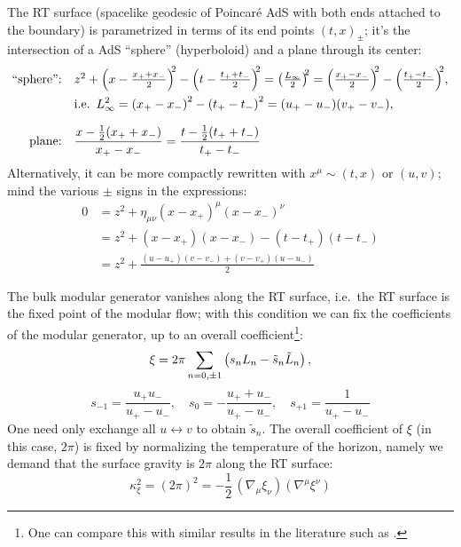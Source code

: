 \documentclass[11pt,a4paper,utf8]{article}
\begin{document}
	The RT surface (spacelike geodesic of Poincar\'e AdS with both ends attached to the boundary) is parametrized in terms of its end points $(t,x)_\pm$; it's the intersection of a AdS ``sphere'' (hyperboloid) and a plane through its center:
	\begin{equation}
	\begin{aligned}
	\text{``sphere'':} &&&\mathsmaller{
		z^2
		+ \pqty{x - \frac{x_+ + x_-}{2}}^{\!\!2}
		- \pqty{t - \frac{t_+ + t_-}{2}}^{\!\!2}
		= \pqty{\frac{L_\infty}{2}}^{\!\!2}
		= \pqty{\frac{x_+ - x_-}{2}}^{\!\!2}
		- \pqty{\frac{t_+ - t_-}{2}}^{\!\!2}
	},\\
	&&& \text{i.e.}\ \,
		L_\infty^2
		= \pqty{x_+ - x_-}^2
			- \pqty{t_+ - t_-}^2
		= (u_+ - u_-)(v_+ - v_-),
	\\[1.5ex]
	\text{plane:} &&&
		\frac{x - \frac{1}{2} (x_+ + x_-)}{x_+ - x_-}
		= \frac{t - \frac{1}{2} (t_+ + t_-)}{t_+ - t_-}
	\end{aligned}
	\end{equation}
	Alternatively, it can be more compactly rewritten with $x^\mu \sim (t,x)$ or $(u,v)$; mind the various $\pm$ signs in the expressions: 
	\begin{equation}
	\begin{aligned}
		0 &= z^2
			+ \eta_{\mu\nu} (x - x_+)^\mu (x - x_-)^\nu \\
		& = z^2
			+ (x - x_+)(x - x_-)
			- (t - t_+)(t - t_-) \\
		&= z^2 + \frac{
				(u - u_+)(v - v_-)
				+ (v - v_+)(u - u_-)
			}{2}
	\end{aligned}
	\end{equation}
	
	The bulk modular generator vanishes along the RT surface, i.e.~the RT surface is the fixed point of the modular flow; with this condition we can fix the coefficients of the modular generator, up to an overall coefficient\footnote{
		One can compare this with similar results in the literature such as \cite{Lashkari:2016idm,Czech:2019vih,Apolo:2020qjm}. 
	}:
	\begin{equation}
		\xi = 2\pi \sum_{n=0,\pm 1} \left(
				s_n L_n - \tilde{s}_n \tilde{L}_n
			\right),
	\end{equation}
	\begin{equation}
		s_{-1} = \frac{u_+ u_-}{u_+ - u_-},\quad
		s_0 = - \frac{u_+ + u_-}{u_+ - u_-},\quad
		s_{+1} = \frac{1}{u_+ - u_-}
	\end{equation}
	One need only exchange all $u\leftrightarrow v$ to obtain $\tilde{s}_n$. The overall coefficient of $\xi$ (in this case, $2\pi$) is fixed by normalizing the temperature of the horizon, namely we demand that the surface gravity is $2\pi$ along the RT surface:
	\begin{equation}
		\kappa_\xi^2
		= (2\pi)^2
		= -\frac{1}{2}\,
			(\nabla_{\mu} \xi_{\nu})
			(\nabla^{\mu} \xi^{\nu})
	\end{equation}
	
\end{document}
